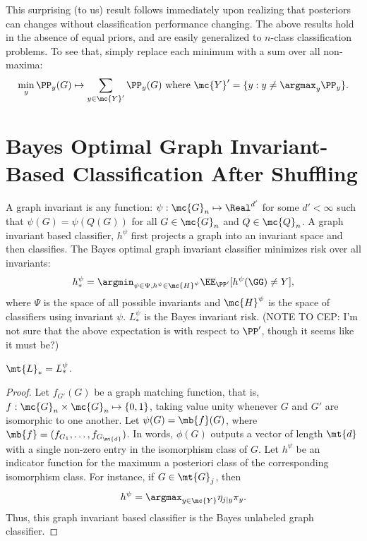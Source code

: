 \documentclass[10pt,journal,cspaper,compsoc]{IEEEtran}
\newcommand{\Qs}{Q}
\begin{document}
This surprising (to us) result follows immediately upon realizing that posteriors can changes without classification performance changing.  The above results hold in the absence of equal priors, and are easily generalized to  $n$-class classification problems.  To see that, simply replace each minimum with a sum over all non-maxima: $$\min_y \PP_y(G) \mapsto \sum_{y \in \mc{Y}'} \PP_y(G) \text{ where } \mc{Y}' =\{y : y \neq \argmax_y \PP_y\}.$$



\section{Bayes Optimal Graph Invariant-Based Classification After Shuffling} %
\label{sec:gi}

A graph invariant is any function: $\psi: \mc{G}_n \mapsto \Real^{d'}$  for some $d' < \infty$ such that $\psi(G)=\psi(\Qs(G))$ for all $G \in \mc{G}_n$ and $\Qs \in \mc{Q}_n$.  A graph invariant based classifier, $h^{\psi}$ first projects a graph into an invariant space and then classifies.  The Bayes optimal graph invariant classifier minimizes risk over all invariants: 
\begin{align}
	h_*^{\psi}=\argmin_{\psi \in \Psi, h^{\psi} \in \mc{H}^{\psi}} \EE_{\PP'}[h^{\psi}(\GG)\neq Y],
\end{align}
where $\Psi$ is the space of all possible invariants and $\mc{H}^{\psi}$ is the space of classifiers using invariant $\psi$.   $L_*^{\psi}$ is the Bayes invariant risk.  (NOTE TO CEP: I'm not sure that the above expectation is with respect to $\PP'$, though it seems like it must be?)

\begin{thm}
	$\mt{L}_*=L_*^\psi$.
\end{thm}

\begin{proof}
 Let $f_{G'}(G)$ be a graph matching function, that is, $f: \mc{G}_n \times \mc{G}_n \mapsto \{0,1\}$, taking value unity whenever $G$ and $G'$ are isomorphic to one another.  Let $\psi(G)=\mb{f}(G)$, where $\mb{f}=(f_{G_1}, \ldots, f_{G_{\mt{d}}})$.  In words, $\phi(G)$ outputs a vector of length $\mt{d}$ with a single non-zero entry in the isomorphism class of $G$.  Let $h^{\psi}$ be an indicator function for the maximum a posteriori class of the corresponding isomorphism class. For instance, if $G \in \mt{G}_j$, then
\begin{align}
	h^{\psi}= \argmax_{y \in \mc{Y}} \eta_{j|y} \pi_y.
\end{align}
Thus, this graph invariant based classifier is the Bayes unlabeled graph classifier.
\end{proof}
\end{document}
